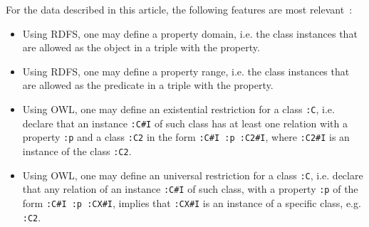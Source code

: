 \documentclass[data,datadescriptor,submit,moreauthors,pdftex]{Definitions/mdpi}
\newcommand{\textttt}[1] {\texttt{\footnotesize#1}}
\begin{document}
For the data described in this article, the following features are most relevant~\cite{rdfs,ont}:
\begin{itemize}
  \item Using RDFS, one may define a property domain, i.e. the class instances that are allowed as the object in a triple with the property.
  \item Using RDFS, one may define a property range, i.e. the class instances that are allowed as the predicate in a triple with the property.
  \item Using OWL, one may define an existential restriction for a class \textttt{:C},
    i.e. declare that an instance \textttt{:C\#I} of such class has at least one relation with a property \textttt{:p} and a class \textttt{:C2} in the form
    \textttt{:C\#I :p :C2\#I}, where \textttt{:C2\#I} is an instance of the class \textttt{:C2}.
  \item Using OWL, one may define an universal restriction for a class \textttt{:C},
    i.e. declare that any relation of an instance \textttt{:C\#I} of such class, with a property \textttt{:p} of the form \textttt{:C\#I :p :CX\#I},
    implies that \textttt{:CX\#I} is an instance of a specific class, e.g. \textttt{:C2}.
\end{itemize}
\end{document}
